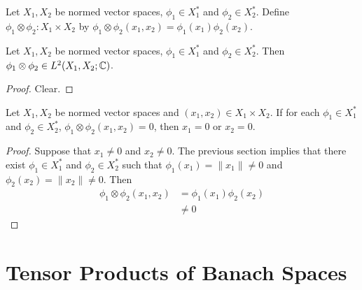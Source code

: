 \documentclass{book}
\begin{document}
	\begin{defn}
	Let $X_1, X_2$ be normed vector spaces, $\phi_1 \in X_1^*$ and $\phi_2 \in X_2^*$. Define $\phi_1 \otimes \phi_2: X_1 \times X_2$ by $\phi_1 \otimes \phi_2(x_1, x_2) = \phi_1(x_1)\phi_2(x_2)$. 
	\end{defn}
	
	\begin{ex}
	Let $X_1, X_2$ be normed vector spaces, $\phi_1 \in X_1^*$ and $\phi_2 \in X_2^*$. Then $\phi_1 \otimes \phi_2 \in L^2(X_1, X_2; \mathbb{C})$.
	\end{ex}
	
	\begin{proof}
	Clear.
	\end{proof}
	
	\begin{ex}
	Let $X_1, X_2$ be normed vector spaces and $(x_1, x_2) \in X_1 \times X_2$. If for each $\phi_1 \in X_1^*$ and $\phi_2 \in X_2^*$, $\phi_1 \otimes \phi_2 (x_1, x_2) = 0$, then $x_1 = 0$ or $x_2 = 0$. 
	\end{ex}
	
	\begin{proof}
	Suppose that $x_1 \neq 0$ and $x_2 \neq 0$. The previous section implies that there exist $\phi_1 \in X_1^*$ and $\phi_2 \in X_2^*$ such that $\phi_1(x_1) = \|x_1\| \neq 0$ and $\phi_2(x_2) = \|x_2\| \neq 0$. Then 
	\begin{align*}
	\phi_1 \otimes \phi_2 (x_1, x_2) 
	& = \phi_1(x_1) \phi_2(x_2) \\
	& \neq 0
	\end{align*}
	\end{proof}









































\newpage
\section{Tensor Products of Banach Spaces}
\end{document}
